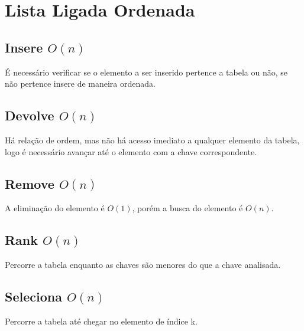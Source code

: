 \documentclass{article}
\begin{document}
\section{Lista Ligada Ordenada}

\subsection{Insere $O(n)$} 
É necessário verificar se o elemento a ser inserido pertence a tabela ou não, se não pertence insere de maneira
ordenada.
\subsection{Devolve $O(n)$}
Há relação de ordem, mas não há acesso imediato a qualquer elemento da tabela, logo é necessário avançar até
o elemento com a chave correspondente.
\subsection{Remove $O(n)$}
A eliminação do elemento é $O(1)$, porém a busca do elemento é $O(n)$.
\subsection{Rank $O(n)$}
Percorre a tabela enquanto as chaves são menores do que a chave analisada.
\subsection{Seleciona $O(n)$}
Percorre a tabela até chegar no elemento de índice k.
\end{document}
